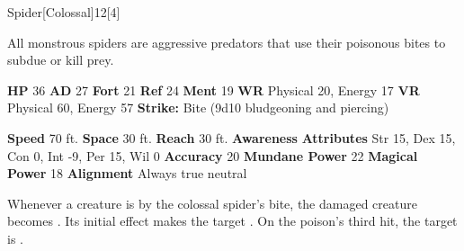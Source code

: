   
  \begin{monsection}{Spider}[Colossal]{12}[4]
    \vspace{-1em}\vspace{-1em}
    \vspace{0em}

    
    All monstrous spiders are aggressive predators that use their poisonous bites to subdue or kill prey.
  
    

    \begin{spellcontent}
      \begin{spelltargetinginfo}
        \pari \textbf{HP} 36 \monsep
          \textbf{AD} 27 \monsep
          \textbf{Fort} 21 \monsep
          \textbf{Ref} 24 \monsep
          \textbf{Ment} 19
        \pari \textbf{WR} Physical 20, Energy 17 \monsep
        \textbf{VR} Physical 60, Energy 57
        \pari \textbf{Strike:}
            Bite  (9d10 bludgeoning and piercing)
      \end{spelltargetinginfo}
    \end{spellcontent}
    \begin{monsterfooter}
      \pari \textbf{Speed} 70 ft. \monsep
        \textbf{Space} 30 ft. \monsep
        \textbf{Reach} 30 ft.
      \pari \textbf{Awareness} 
      \pari \textbf{Attributes}
        Str 15, Dex 15,
        Con 0, Int -9,
        Per 15, Wil 0
      \pari \textbf{Accuracy} 20 \monsep
        \textbf{Mundane Power} 22 \monsep
      \textbf{Magical Power} 18
      \pari \textbf{Alignment} Always true neutral
    \end{monsterfooter}
  \end{monsection}
    Whenever a creature is  by the colossal spider's bite,
      the damaged creature becomes .
    Its initial effect makes the target .
    On the poison's third hit, the target is .
  
